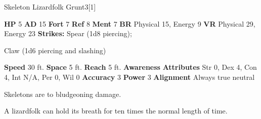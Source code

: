       
  \begin{monsubsection}{Skeleton Lizardfolk Grunt}{3}[1]
    \vspace{-1em}\vspace{-1em}
    \vspace{0em}

    
    

    \begin{spellcontent}
      \begin{spelltargetinginfo}
        \pari \textbf{HP} 5 \monsep
          \textbf{AD} 15 \monsep
          \textbf{Fort} 7 \monsep
          \textbf{Ref} 8 \monsep
          \textbf{Ment} 7
        \pari \textbf{BR} Physical 15, Energy 9 \monsep
        \textbf{VR} Physical 29, Energy 23
        \pari \textbf{Strikes:}
            Spear  (1d8 piercing);
\par Claw  (1d6 piercing and slashing)
      \end{spelltargetinginfo}
    \end{spellcontent}
    \begin{monsterfooter}
      \pari \textbf{Speed} 30 ft. \monsep
        \textbf{Space} 5 ft. \monsep
        \textbf{Reach} 5 ft.
      \pari \textbf{Awareness} 
      \pari \textbf{Attributes}
        Str 0, Dex 4,
        Con 4, Int N/A,
        Per 0, Wil 0
      \pari \textbf{Accuracy} 3 \monsep
        \textbf{Power} 3
      \pari \textbf{Alignment} Always true neutral
    \end{monsterfooter}
  \end{monsubsection}
          Skeletons are  to bludgeoning damage.
        
     A lizardfolk can hold its breath for ten times the normal length of time.
  

